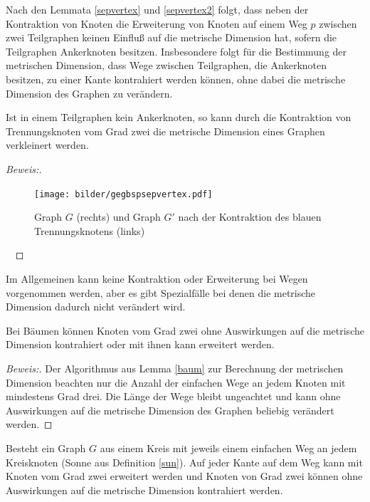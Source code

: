 \begin{bem}
Nach den Lemmata \ref{sepvertex} und \ref{sepvertex2} folgt, dass neben der Kontraktion von Knoten die Erweiterung von Knoten auf einem Weg $p$ zwischen zwei Teilgraphen keinen Einfluß auf die metrische Dimension hat, sofern die Teilgraphen Ankerknoten besitzen. Insbesondere folgt für die Bestimmung der metrischen Dimension, dass Wege zwischen Teilgraphen, die Ankerknoten besitzen, zu einer Kante kontrahiert werden können, ohne dabei die metrische Dimension des Graphen zu verändern.
\end{bem}
\begin{lem}
Ist in einem Teilgraphen kein Ankerknoten, so kann durch die Kontraktion von Trennungsknoten vom Grad zwei die metrische Dimension eines Graphen verkleinert werden.
\end{lem}
\begin{proof}[Beweis:] ~ \newline
\vspace{-7mm}
\begin{figure}[!h]
\centering
\texttt{[image: bilder/gegbspsepvertex.pdf]}
\caption{Graph $G$ (rechts) und Graph $G'$ nach der Kontraktion des blauen Trennungsknotens (links)}
\end{figure} 
\vspace{-8mm}
~\linebreak
\end{proof}
Im Allgemeinen kann keine Kontraktion oder Erweiterung bei Wegen vorgenommen werden, aber es gibt Spezialfälle bei denen die metrische Dimension dadurch nicht verändert wird.
\begin{lem}
Bei Bäumen können Knoten vom Grad zwei ohne Auswirkungen auf die metrische Dimension kontrahiert oder mit ihnen kann erweitert werden.
\end{lem}
\begin{proof}[Beweis:]
Der Algorithmus aus Lemma \ref{baum} zur Berechnung der metrischen Dimension beachten nur die Anzahl der einfachen Wege an jedem Knoten mit mindestens Grad drei. Die Länge der Wege bleibt ungeachtet und kann ohne Auswirkungen auf die metrische Dimension des Graphen beliebig verändert werden.
\end{proof}
\begin{lem}
\label{sonneerweiterung}
Besteht ein Graph $G$ aus einem Kreis mit jeweils einem einfachen Weg an jedem Kreisknoten (Sonne aus Definition \ref{sun}). Auf jeder Kante auf dem Weg kann mit Knoten vom Grad zwei erweitert werden und Knoten von Grad zwei können ohne Auswirkungen auf die metrische Dimension kontrahiert werden.
\end{lem}

